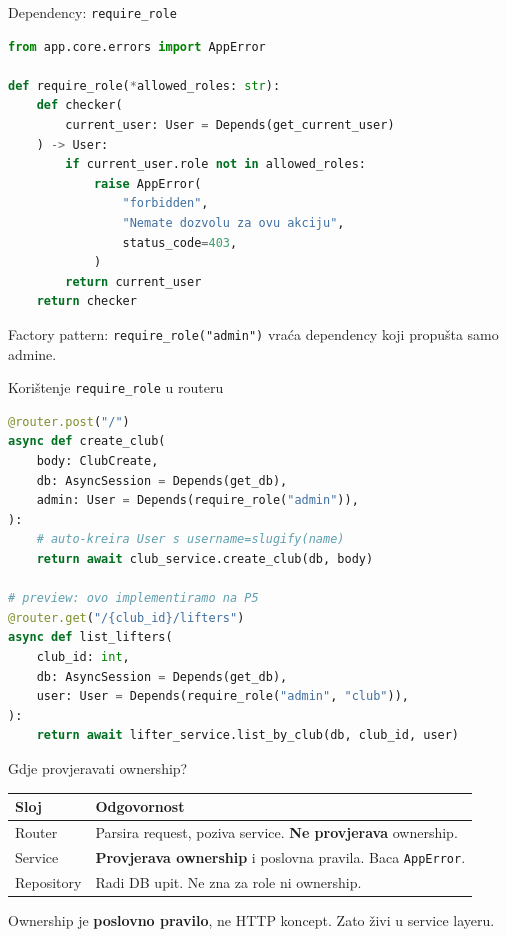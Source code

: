 \begin{frame}[fragile,shrink=5]{Dependency: \texttt{require\_role}}
\begin{lstlisting}[language=python]
from app.core.errors import AppError

def require_role(*allowed_roles: str):
    def checker(
        current_user: User = Depends(get_current_user)
    ) -> User:
        if current_user.role not in allowed_roles:
            raise AppError(
                "forbidden",
                "Nemate dozvolu za ovu akciju",
                status_code=403,
            )
        return current_user
    return checker
\end{lstlisting}

\vspace{0.4em}
Factory pattern: \texttt{require\_role("admin")} vraća dependency koji propušta samo admine.
\end{frame}

\begin{frame}[fragile,shrink=5]{Korištenje \texttt{require\_role} u routeru}
\begin{lstlisting}[language=python]
@router.post("/")
async def create_club(
    body: ClubCreate,
    db: AsyncSession = Depends(get_db),
    admin: User = Depends(require_role("admin")),
):
    # auto-kreira User s username=slugify(name)
    return await club_service.create_club(db, body)

# preview: ovo implementiramo na P5
@router.get("/{club_id}/lifters")
async def list_lifters(
    club_id: int,
    db: AsyncSession = Depends(get_db),
    user: User = Depends(require_role("admin", "club")),
):
    return await lifter_service.list_by_club(db, club_id, user)
\end{lstlisting}
\end{frame}

\begin{frame}{Gdje provjeravati ownership?}
\begin{tabular}{@{}lp{8cm}@{}}
  \toprule
  \textbf{Sloj} & \textbf{Odgovornost} \\
  \midrule
  Router & Parsira request, poziva service. \textbf{Ne provjerava} ownership. \\
  \midrule
  Service & \textbf{Provjerava ownership} i poslovna pravila. Baca \texttt{AppError}. \\
  \midrule
  Repository & Radi DB upit. Ne zna za role ni ownership. \\
  \bottomrule
\end{tabular}

\vspace{0.6em}
Ownership je \textbf{poslovno pravilo}, ne HTTP koncept. Zato živi u service layeru.
\end{frame}

